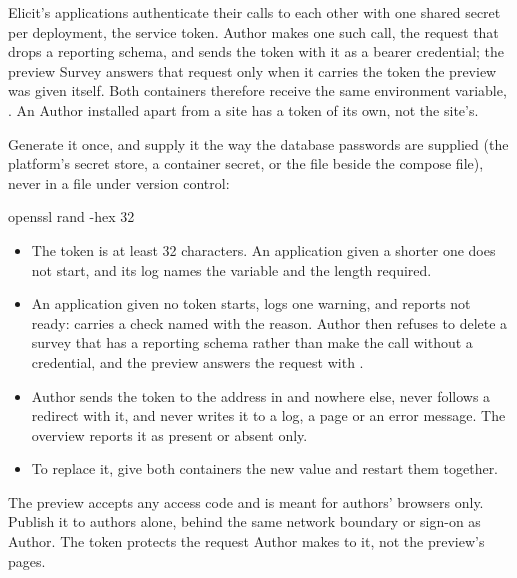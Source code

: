 \documentclass[11pt, a4paper]{article}
\begin{document}
Elicit's applications authenticate their calls to each other with one shared secret per
deployment, the service token. Author makes one such call, the request that drops a reporting
schema, and sends the token with it as a bearer credential; the preview Survey answers that
request only when it carries the token the preview was given itself. Both containers therefore
receive the same environment variable, . An Author installed apart
from a site has a token of its own, not the site's.

Generate it once, and supply it the way the database passwords are supplied (the platform's
secret store, a container secret, or the  file beside the compose file), never in
a file under version control:

\begin{elicitcmd}
openssl rand -hex 32
\end{elicitcmd}

\begin{itemize}
  \item The token is at least 32 characters. An application given a shorter one does not
        start, and its log names the variable and the length required.
  \item An application given no token starts, logs one warning, and reports not ready:
         carries a check named  with the reason.
        Author then refuses to delete a survey that has a reporting schema rather than
        make the call without a credential, and the preview answers the request with
        .
  \item Author sends the token to the address in  and nowhere
        else, never follows a redirect with it, and never writes it to a log, a page or an
        error message. The  overview reports it as present or absent only.
  \item To replace it, give both containers the new value and restart them together.
\end{itemize}

\begin{elicitsecurity}
The preview accepts any access code and is meant for authors' browsers only. Publish it to
authors alone, behind the same network boundary or sign-on as Author. The token protects the
request Author makes to it, not the preview's pages.
\end{elicitsecurity}

\end{document}

